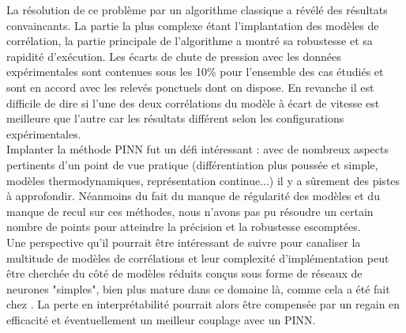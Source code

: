 La résolution de ce problème par un algorithme classique a révélé des résultats convaincants. La partie la plus complexe étant l'implantation des modèles de corrélation, la partie principale de l'algorithme a montré sa robustesse et sa rapidité d'exécution. Les écarts de chute de pression avec les données expérimentales sont contenues sous les 10\% pour l'ensemble des cas étudiés et sont en accord avec les relevés ponctuels dont on dispose. En revanche il est difficile de dire si l'une des deux corrélations du modèle à écart de vitesse est meilleure que l'autre car les résultats différent selon les configurations expérimentales.\\

Implanter la méthode PINN fut un défi intéressant : avec de nombreux aspects pertinents d'un point de vue pratique (différentiation plus poussée et simple, modèles thermodynamiques, représentation continue...) il y a sûrement des pistes à approfondir. Néanmoins du fait du manque de régularité des modèles et du manque de recul sur ces méthodes, nous n'avons pas pu résoudre un certain nombre de points pour atteindre la précision et la robustesse escomptées.\\

Une perspective qu'il pourrait être intéressant de suivre pour canaliser la multitude de modèles de corrélations et leur complexité d'implémentation peut être cherchée du côté de modèles réduits conçus sous forme de réseaux de neurones "simples", bien plus mature dans ce domaine là, comme cela a été fait chez \cite{alvarezdelcastilloNewVoidFraction2012}. La perte en interprétabilité pourrait alors être compensée par un regain en efficacité et éventuellement un meilleur couplage avec un PINN.